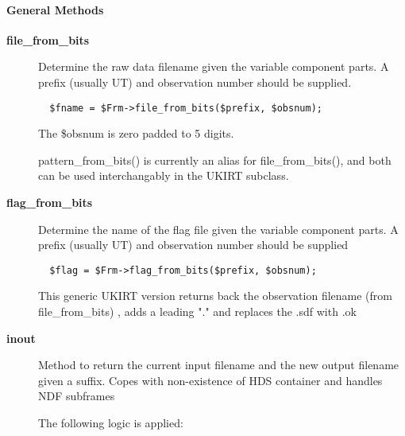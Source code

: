 \paragraph*{General Methods\label{ORAC::Frame::UKIRT_General_Methods}}
\begin{description}

\item[\textbf{file\_from\_bits}] \mbox{}

Determine the raw data filename given the variable component
parts. A prefix (usually UT) and observation number should
be supplied.

\begin{verbatim}
  $fname = $Frm->file_from_bits($prefix, $obsnum);
\end{verbatim}


The \$obsnum is zero padded to 5 digits.



pattern\_from\_bits() is currently an alias for file\_from\_bits(),
and both can be used interchangably in the UKIRT subclass.


\item[\textbf{flag\_from\_bits}] \mbox{}

Determine the name of the flag file given the variable
component parts. A prefix (usually UT) and observation number
should be supplied

\begin{verbatim}
  $flag = $Frm->flag_from_bits($prefix, $obsnum);
\end{verbatim}


This generic UKIRT version returns back the observation filename (from
file\_from\_bits) , adds a leading "." and replaces the .sdf with .ok


\item[\textbf{inout}] \mbox{}

Method to return the current input filename and the new output
filename given a suffix.  Copes with non-existence of HDS container
and handles NDF subframes



The following logic is applied:


\end{description}
